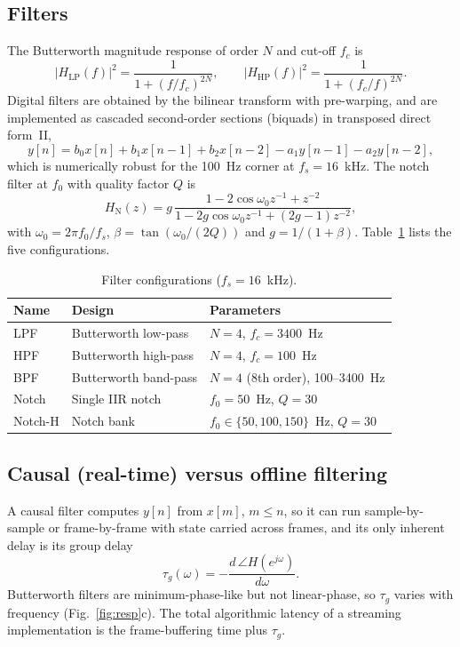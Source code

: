 \documentclass[conference]{IEEEtran}
\begin{document}
\subsection{Filters}
The Butterworth magnitude response of order $N$ and cut-off $f_c$ is
\begin{equation}
|H_{\mathrm{LP}}(f)|^2=\frac{1}{1+(f/f_c)^{2N}},\qquad |H_{\mathrm{HP}}(f)|^2=\frac{1}{1+(f_c/f)^{2N}}.
\label{eq:butter}
\end{equation}
Digital filters are obtained by the bilinear transform with pre-warping, and are implemented as cascaded second-order sections (biquads) in transposed direct form~II,
\begin{equation}
y[n]=b_0x[n]+b_1x[n-1]+b_2x[n-2]-a_1y[n-1]-a_2y[n-2],
\label{eq:biquad}
\end{equation}
which is numerically robust for the 100~Hz corner at $f_s=16$~kHz. The notch filter at $f_0$ with quality factor $Q$ is
\begin{equation}
H_{\mathrm{N}}(z)=g\,\frac{1-2\cos\omega_0 z^{-1}+z^{-2}}{1-2g\cos\omega_0 z^{-1}+(2g-1)z^{-2}},
\label{eq:notch}
\end{equation}
with $\omega_0=2\pi f_0/f_s$, $\beta=\tan(\omega_0/(2Q))$ and $g=1/(1+\beta)$. Table~\ref{tab:filters} lists the five configurations.

\begin{table}[!t]
\caption{Filter configurations ($f_s=16$~kHz).}
\label{tab:filters}
\centering\footnotesize
\begin{tabular}{lll}
\hline
Name & Design & Parameters \\ \hline
LPF & Butterworth low-pass & $N=4$, $f_c=3400$~Hz \\
HPF & Butterworth high-pass & $N=4$, $f_c=100$~Hz \\
BPF & Butterworth band-pass & $N=4$ (8th order), 100--3400~Hz \\
Notch & Single IIR notch & $f_0=50$~Hz, $Q=30$ \\
Notch-H & Notch bank & $f_0\in\{50,100,150\}$~Hz, $Q=30$ \\ \hline
\end{tabular}
\end{table}

\subsection{Causal (real-time) versus offline filtering}
A causal filter computes $y[n]$ from $x[m]$, $m\le n$, so it can run sample-by-sample or frame-by-frame with state carried across frames, and its only inherent delay is its group delay
\begin{equation}
\tau_g(\omega)=-\frac{d\,\angle H(e^{j\omega})}{d\omega}.
\label{eq:gd}
\end{equation}
Butterworth filters are minimum-phase-like but not linear-phase, so $\tau_g$ varies with frequency (Fig.~\ref{fig:resp}c). The total algorithmic latency of a streaming implementation is the frame-buffering time plus $\tau_g$.
\end{document}

